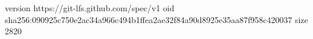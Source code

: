 version https://git-lfs.github.com/spec/v1
oid sha256:090925c750e2ac34a966c494b1ffea2ae32f84a90d8925e35aa87f958c420037
size 2820
